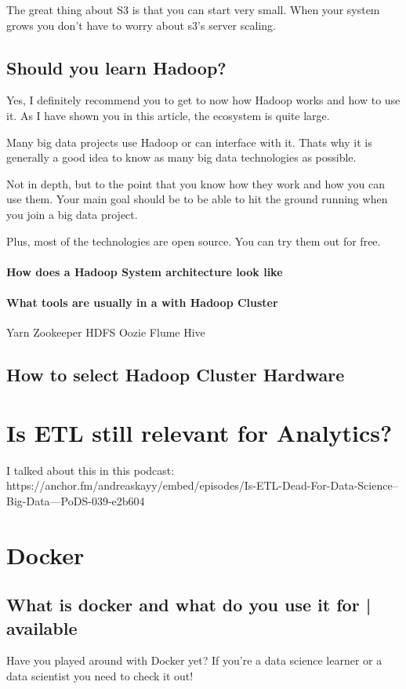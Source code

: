 \documentclass[12pt, numbers=noenddot]{scrreprt} %
\begin{document}
The great thing about S3 is that you can start very small. When your system grows you don’t have to worry about s3’s server scaling.

\section{Should you learn Hadoop? }

Yes, I definitely recommend you to get to now how Hadoop works and how to use it. As I have shown you in this article, the ecosystem is quite large.

Many big data projects use Hadoop or can interface with it. Thats why it is generally a good idea to know as many big data technologies as possible.

Not in depth, but to the point that you know how they work and how you can use them. Your main goal should be to be able to hit the ground running when you join a big data project.

Plus, most of the technologies are open source. You can try them out for free.
\subsubsection{How does a Hadoop System architecture look like}
\subsubsection{What tools are usually in a with Hadoop Cluster}
Yarn
Zookeeper
HDFS
Oozie
Flume
Hive
\section{How to select Hadoop Cluster Hardware}

\chapter{Is ETL still relevant for Analytics?}
I talked about this in this podcast: https://anchor.fm/andreaskayy/embed/episodes/Is-ETL-Dead-For-Data-Science--Big-Data---PoDS-039-e2b604


\chapter{Docker}

\section{What is docker and what do you use it for | available}
Have you played around with Docker yet? If you’re a data science learner or a data scientist you need to check it out!
\end{document}
